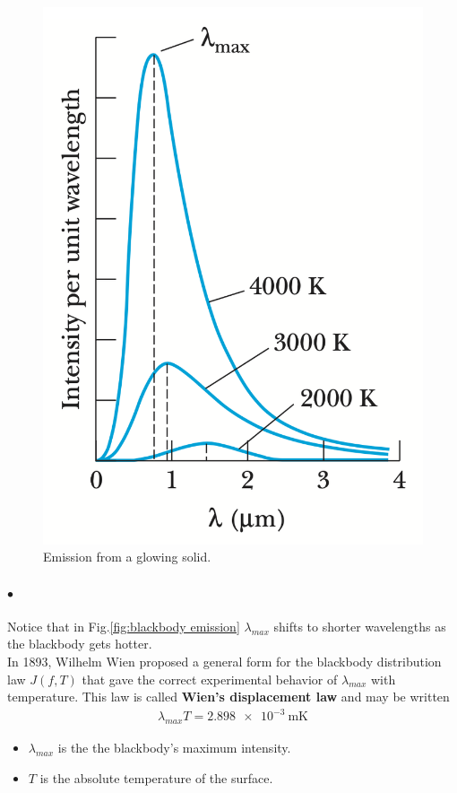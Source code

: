 \documentclass[a4paper]{report}
\begin{document}
            \begin{figure}
                \includegraphics[width=0.9\linewidth]{figures/blackbody emission.png}
                \caption{Emission from a glowing solid.}
                \label{fig:blackbody emission}
            \end{figure}
            
            \paragraph{$\bullet$} Notice that in Fig.\eqref{fig:blackbody emission} $\lambda_{max}$ shifts
            to shorter wavelengths as the blackbody gets hotter.\\
            In 1893, Wilhelm Wien proposed a general form for the blackbody distribution law 
            $J(f, T)$ that gave the correct experimental behavior of $\lambda_{max}$ with temperature. This 
            law is called \textbf{Wien’s displacement law} and may be written
            \begin{align} \label{Wien's displacement law}
                \lambda_{max} T = \SI{2.898e-3}{\m\K}
            \end{align}
            {\tiny \begin{itemize}
                \item $\lambda_{max}$ is the the blackbody’s maximum intensity.
                \item $T$ is the absolute temperature of the surface.
            \end{itemize}}
            
\end{document}
